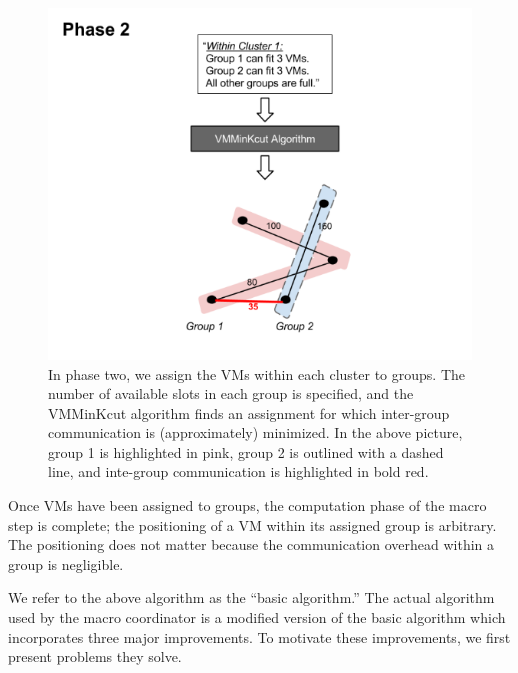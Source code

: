 \documentclass[11pt]{article}
\begin{document}
\begin{figure}
  \centering
\includegraphics[scale=0.7]{phase2.png}

 \caption{In phase two, we assign the VMs within each cluster to groups.  The number of available slots in each group is specified, and the VMMinKcut algorithm finds an assignment for which inter-group communication is (approximately) minimized.  In the above picture, group 1 is highlighted in pink, group 2 is outlined with a dashed line, and inte-group communication is highlighted in bold red.}
 
 \label{fig:macro-basic-2}

\end{figure}

Once VMs have been assigned to groups, the computation phase of the macro step is complete; the positioning of a VM within its assigned group is arbitrary.  The positioning does not matter because the communication overhead within a group is negligible.

We refer to the above algorithm as the ``basic algorithm.''  The actual algorithm used by the macro coordinator is a modified version of the basic algorithm which incorporates three major improvements.  To motivate these improvements, we first present problems they solve.
\end{document}
